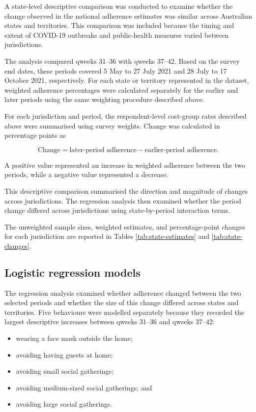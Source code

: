 \documentclass[
  12pt,
  a4paper,
]{article}
\providecommand{\tightlist}{%
  \setlength{\itemsep}{0pt}\setlength{\parskip}{0pt}}
\begin{document}
A state-level descriptive comparison was conducted to examine whether
the change observed in the national adherence estimates was similar
across Australian states and territories. This comparison was included
because the timing and extent of COVID-19 outbreaks and public-health
measures varied between jurisdictions.

The analysis compared qweeks 31--36 with qweeks 37--42. Based on the
survey end dates, these periods covered 5 May to 27 July 2021 and 28
July to 17 October 2021, respectively. For each state or territory
represented in the dataset, weighted adherence percentages were
calculated separately for the earlier and later periods using the same
weighting procedure described above.

For each jurisdiction and period, the respondent-level cost-group rates
described above were summarised using survey weights. Change was
calculated in percentage points as

\[
\text{Change}
=
\text{later-period adherence}
-
\text{earlier-period adherence}.
\]

A positive value represented an increase in weighted adherence between
the two periods, while a negative value represented a decrease.

This descriptive comparison summarised the direction and magnitude of
changes across jurisdictions. The regression analysis then examined
whether the period change differed across jurisdictions using
state-by-period interaction terms.

The unweighted sample sizes, weighted estimates, and percentage-point
changes for each jurisdiction are reported in Tables
\ref{tab:state-estimates} and \ref{tab:state-changes}.

\subsection{Logistic regression models}\label{logistic-regression-models}

The regression analysis examined whether adherence changed between the
two selected periods and whether the size of this change differed across
states and territories. Five behaviours were modelled separately because
they recorded the largest descriptive increases between qweeks 31--36
and qweeks 37--42:

\begin{itemize}
\tightlist
\item
  wearing a face mask outside the home;
\item
  avoiding having guests at home;
\item
  avoiding small social gatherings;
\item
  avoiding medium-sized social gatherings; and
\item
  avoiding large social gatherings.
\end{itemize}
\end{document}
